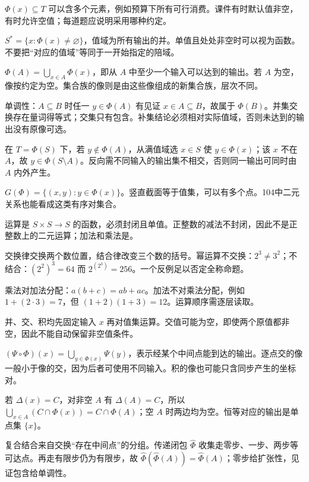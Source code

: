 $\Phi(x)\subseteq T$ 可以含多个元素，例如预算下所有可行消费。课件有时默认值非空，有时允许空值；每道题应说明采用哪种约定。

$S^*=\{x:\Phi(x)\ne\varnothing\}$，值域为所有输出的并。单值且处处非空时可以视为函数。不要把“对应的值域”等同于一开始指定的陪域。

$\Phi(A)=\bigcup_{x\in A}\Phi(x)$，即从 $A$ 中至少一个输入可以达到的输出。若 $A$ 为空，像按约定为空。集合族的像则是由这些像组成的新集合族，层次不同。

单调性：$A\subseteq B$ 时任一 $y\in\Phi(A)$ 有见证 $x\in A\subseteq B$，故属于 $\Phi(B)$。并集交换存在量词得等式；交集只有包含。补集结论必须相对实际值域，否则未达到的输出没有原像可选。

在 $T=\Phi(S)$ 下，若 $y\notin\Phi(A)$，从满值域选 $x\in S$ 使 $y\in\Phi(x)$；该 $x$ 不在 $A$，故 $y\in\Phi(S\setminus A)$。反向需不同输入的输出集不相交，否则同一输出可同时由 $A$ 内外产生。

$G(\Phi)=\{(x,y):y\in\Phi(x)\}$。竖直截面等于值集，可以有多个点。104中二元关系也能看成这类有序对集合。

运算是 $S\times S\to S$ 的函数，必须封闭且单值。正整数的减法不封闭，因此不是正整数上的二元运算；加法和乘法是。

交换律交换两个数位置，结合律改变三个数的括号。幂运算不交换：$2^3\ne3^2$；不结合：$(2^2)^3=64$ 而 $2^{(2^3)}=256$。一个反例足以否定全称命题。

乘法对加法分配：$a(b+c)=ab+ac$。加法不对乘法分配，例如 $1+(2\cdot3)=7$，但 $(1+2)(1+3)=12$。运算顺序需逐层读取。

并、交、积均先固定输入 $x$ 再对值集运算。交值可能为空，即使两个原值都非空，因此不能自动保留非空值条件。

$(\Psi\circ\Phi)(x)=\bigcup_{y\in\Phi(x)}\Psi(y)$，表示经某个中间点能到达的输出。逐点交的像一般小于像的交，因为后者可使用不同输入。积的像也可能只含同步产生的坐标对。

若 $\Delta(x)=C$，对非空 $A$ 有 $\Delta(A)=C$，所以 $\bigcup_{x\in A}(C\cap\Phi(x))=C\cap\Phi(A)$；空 $A$ 时两边均为空。恒等对应的输出是单点集 $\{x\}$。

复合结合来自交换“存在中间点”的分组。传递闭包 $\widehat\Phi$ 收集走零步、一步、两步等可达点。再走有限步仍为有限步，故 $\widehat\Phi(\widehat\Phi(A))=\widehat\Phi(A)$；零步给扩张性，见证包含给单调性。

